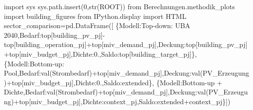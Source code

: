 \documentclass[
  ngerman,
  a4paper,
  DIV=11]{scrreprt}
\newenvironment{Shaded}{\begin{snugshade}}{\end{snugshade}}
\newcommand{\BuiltInTok}[1]{\textcolor[rgb]{0.00,0.23,0.31}{#1}}
\newcommand{\DecValTok}[1]{\textcolor[rgb]{0.68,0.00,0.00}{#1}}
\newcommand{\FloatTok}[1]{\textcolor[rgb]{0.68,0.00,0.00}{#1}}
\newcommand{\ImportTok}[1]{\textcolor[rgb]{0.00,0.46,0.62}{#1}}
\newcommand{\NormalTok}[1]{\textcolor[rgb]{0.00,0.23,0.31}{#1}}
\newcommand{\OperatorTok}[1]{\textcolor[rgb]{0.37,0.37,0.37}{#1}}
\newcommand{\StringTok}[1]{\textcolor[rgb]{0.13,0.47,0.30}{#1}}
\begin{document}
\begin{Shaded}
\begin{Highlighting}[]
\ImportTok{import}\NormalTok{ sys}
\NormalTok{sys.path.insert(}\DecValTok{0}\NormalTok{,}\BuiltInTok{str}\NormalTok{(ROOT))}
\ImportTok{from}\NormalTok{ Berechnungen.methodik\_plots }\ImportTok{import}\NormalTok{ building\_figures}
\ImportTok{from}\NormalTok{ IPython.display }\ImportTok{import}\NormalTok{ HTML}
\NormalTok{sector\_comparison}\OperatorTok{=}\NormalTok{pd.DataFrame([}
\NormalTok{ \{}\StringTok{\textquotesingle{}Modell\textquotesingle{}}\NormalTok{:}\StringTok{\textquotesingle{}Top{-}down: UBA 2040\textquotesingle{}}\NormalTok{,}\StringTok{\textquotesingle{}Bedarf\textquotesingle{}}\NormalTok{:top[}\StringTok{\textquotesingle{}building\_pv\_pj\textquotesingle{}}\NormalTok{]}\OperatorTok{{-}}\NormalTok{top[}\StringTok{\textquotesingle{}building\_operation\_pj\textquotesingle{}}\NormalTok{]}\OperatorTok{+}\NormalTok{top[}\StringTok{\textquotesingle{}miv\_demand\_pj\textquotesingle{}}\NormalTok{],}\StringTok{\textquotesingle{}Deckung\textquotesingle{}}\NormalTok{:top[}\StringTok{\textquotesingle{}building\_pv\_pj\textquotesingle{}}\NormalTok{]}\OperatorTok{+}\NormalTok{top[}\StringTok{\textquotesingle{}miv\_budget\_pj\textquotesingle{}}\NormalTok{],}\StringTok{\textquotesingle{}Dichte\textquotesingle{}}\NormalTok{:}\FloatTok{0.}\NormalTok{,}\StringTok{\textquotesingle{}Saldo\textquotesingle{}}\NormalTok{:top[}\StringTok{\textquotesingle{}building\_target\_pj\textquotesingle{}}\NormalTok{]\},}
\NormalTok{ \{}\StringTok{\textquotesingle{}Modell\textquotesingle{}}\NormalTok{:}\StringTok{\textquotesingle{}Bottom{-}up: Pool\textquotesingle{}}\NormalTok{,}\StringTok{\textquotesingle{}Bedarf\textquotesingle{}}\NormalTok{:val(}\StringTok{\textquotesingle{}Strombedarf\textquotesingle{}}\NormalTok{)}\OperatorTok{+}\NormalTok{top[}\StringTok{\textquotesingle{}miv\_demand\_pj\textquotesingle{}}\NormalTok{],}\StringTok{\textquotesingle{}Deckung\textquotesingle{}}\NormalTok{:val(}\StringTok{\textquotesingle{}PV\_Erzeugung\textquotesingle{}}\NormalTok{)}\OperatorTok{+}\NormalTok{top[}\StringTok{\textquotesingle{}miv\_budget\_pj\textquotesingle{}}\NormalTok{],}\StringTok{\textquotesingle{}Dichte\textquotesingle{}}\NormalTok{:}\FloatTok{0.}\NormalTok{,}\StringTok{\textquotesingle{}Saldo\textquotesingle{}}\NormalTok{:extended\},}
\NormalTok{ \{}\StringTok{\textquotesingle{}Modell\textquotesingle{}}\NormalTok{:}\StringTok{\textquotesingle{}Bottom{-}up + Dichte\textquotesingle{}}\NormalTok{,}\StringTok{\textquotesingle{}Bedarf\textquotesingle{}}\NormalTok{:val(}\StringTok{\textquotesingle{}Strombedarf\textquotesingle{}}\NormalTok{)}\OperatorTok{+}\NormalTok{top[}\StringTok{\textquotesingle{}miv\_demand\_pj\textquotesingle{}}\NormalTok{],}\StringTok{\textquotesingle{}Deckung\textquotesingle{}}\NormalTok{:val(}\StringTok{\textquotesingle{}PV\_Erzeugung\textquotesingle{}}\NormalTok{)}\OperatorTok{+}\NormalTok{top[}\StringTok{\textquotesingle{}miv\_budget\_pj\textquotesingle{}}\NormalTok{],}\StringTok{\textquotesingle{}Dichte\textquotesingle{}}\NormalTok{:context\_pj,}\StringTok{\textquotesingle{}Saldo\textquotesingle{}}\NormalTok{:extended}\OperatorTok{+}\NormalTok{context\_pj\}])}

\end{Highlighting}
\end{Shaded}
\end{document}
